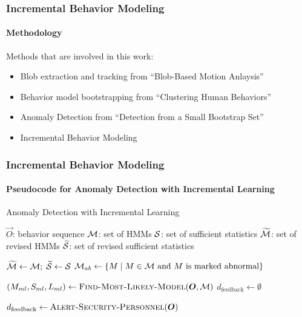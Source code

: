 
\begin{frame}
    \frametitle{Incremental Behavior Modeling}
    \framesubtitle{Methodology}

    Methods that are involved in this work:
    \begin{itemize}
        \item Blob extraction and tracking from ``Blob-Based Motion Anlaysis''
        \item Behavior model bootstrapping from ``Clustering Human Behaviors''
        \item Anomaly Detection from ``Detection from a Small Bootstrap Set''
        \item Incremental Behavior Modeling
    \end{itemize}

\end{frame}


\begin{frame}
    \frametitle{Incremental Behavior Modeling}
    \framesubtitle{Pseudocode for Anomaly Detection with 
        Incremental Learning}

    \begin{algorithm}[H]
        \caption{Anomaly Detection with Incremental Learning}
        \label{anomaly-detection-with-iml-algorithm}
        \begin{algorithmic}
            \REQUIRE $\vec{O}$: behavior sequence 
            \REQUIRE ${\cal M}$: set of HMMs 
            \REQUIRE ${\cal S}$: set of sufficient statistics 
            \ENSURE $\widetilde{\cal M}$: set of revised HMMs 
            \ENSURE $\widetilde{\cal S}$: set of revised sufficient statistics

            \STATE $\widetilde{\cal M} \gets {\cal M}; \; \widetilde{\cal S} \gets {\cal S}$
            \STATE ${\cal M}_{ab} \gets \{ M \mid M \in {\cal M} \text{~and $M$ is marked abnormal} \}$ 

            \STATE $( M_{ml}, S_{ml}, L_{ml} ) \gets
                \textsc{Find-Most-Likely-Model}(\vec{O}, {\cal M})$ 
            \STATE $d_{\text{feedback}} \gets \emptyset$

                \STATE $d_{\text{feedback}} \gets \textsc{Alert-Security-Personnel}(\vec{O})$
            \ENDIF


        \end{algorithmic}
    \end{algorithm}

\end{frame}

